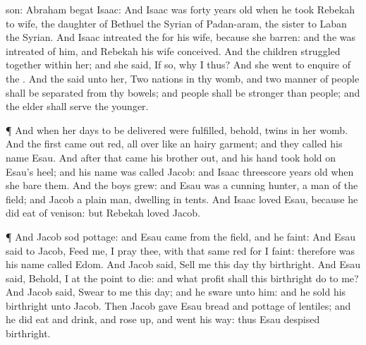 {son:
Abraham
begat
Isaac:
And
Isaac was
forty
years
old when he
took
Rebekah to
wife, the
daughter of
Bethuel the
Syrian of
Padan-aram, the
sister to
Laban the
Syrian.
And
Isaac
intreated the
{}
for his
wife, because she
{}
barren: and the
{} was
intreated of him, and
Rebekah his
wife
conceived.
And the
children struggled
together within
her; and she
said, If
{} so, why
{} I
thus? And she
went to
enquire of the
{}.
And the
{}
said unto her,
Two
nations
{} in thy
womb, and two
manner of
people shall be
separated from thy
bowels; and
{}
people shall be
stronger than
{}
people; and the
elder shall
serve the
younger.
\par }{\PP {}¶ And when her
days to be
delivered were
fulfilled, behold,
{}
twins in her
womb.
And the
first came
out
red, all over like an
hairy
garment; and they
called his
name
Esau.
And
after that
came his
brother
out, and his
hand took
hold on
Esau’s
heel; and his
name was
called
Jacob: and
Isaac
{}
threescore
years
old when she
bare them.
And the
boys
grew: and
Esau was a
cunning
hunter, a
man of the
field; and
Jacob
{} a
plain
man,
dwelling in
tents.
And
Isaac
loved
Esau, because he did
eat of
{}
venison: but
Rebekah
loved
Jacob.
\par }{\PP {}¶ And
Jacob
sod
pottage: and
Esau
came from the
field, and he
{}
faint:
And
Esau
said to
Jacob,
Feed me, I pray thee,
with that
same
red
{} for I
{}
faint: therefore was his
name
called
Edom.
And
Jacob
said,
Sell me this
day thy
birthright.
And
Esau
said, Behold, I
{} at the
point to
die: and what profit shall this
birthright do to me?
And
Jacob
said,
Swear to me this
day; and he
sware unto him: and he
sold his
birthright unto
Jacob.
Then
Jacob
gave
Esau
bread and
pottage of
lentiles; and he did
eat and
drink, and rose
up, and went his
way: thus
Esau
despised
{}
birthright.

}
